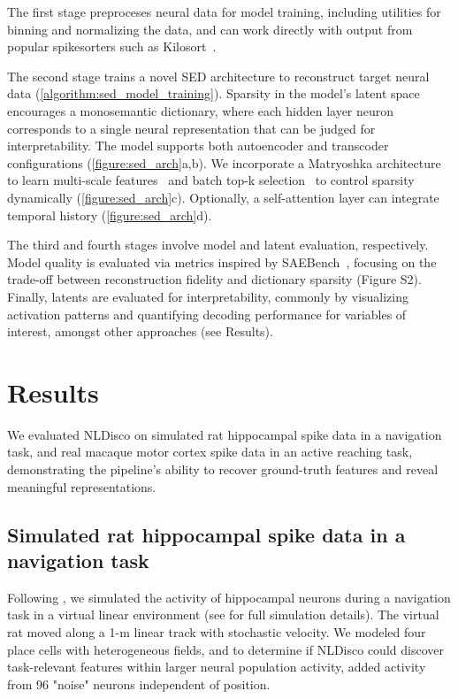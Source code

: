 \documentclass{article}
\begin{document}
The first stage preproceses neural data for model training, including utilities for binning and normalizing the data, and can work directly with output from popular spikesorters such as Kilosort~\citep{pachitariu_2016_kilosort}. 

The second stage trains a novel SED architecture to reconstruct target neural data (\autoref{algorithm:sed_model_training}). Sparsity in the model's latent space encourages a monosemantic dictionary, where each hidden layer neuron corresponds to a single neural representation that can be judged for interpretability. The model supports both autoencoder and transcoder configurations (\autoref{figure:sed_arch}a,b). We incorporate a Matryoshka architecture to learn multi-scale features~\citep{bussmann_2025_msae} and batch top-k selection~\citep{bussmann_2024_batchtopk} to control sparsity dynamically (\autoref{figure:sed_arch}c). Optionally, a self-attention layer can integrate temporal history (\autoref{figure:sed_arch}d).

The third and fourth stages involve model and latent evaluation, respectively. Model quality is evaluated via metrics inspired by SAEBench~\citep{karvonen_2025_saebench}, focusing on the trade-off between reconstruction fidelity and dictionary sparsity (Figure S2). Finally, latents are evaluated for interpretability, commonly by visualizing activation patterns and quantifying decoding performance for variables of interest, amongst other approaches (see Results).

\section{Results}
\label{section:results}

We evaluated NLDisco on simulated rat hippocampal spike data in a navigation task, and real macaque motor cortex spike data in an active reaching task, demonstrating the pipeline's ability to recover ground-truth features and reveal meaningful representations.

\subsection{Simulated rat hippocampal spike data in a navigation task}
\label{subsection:synthetic_results}

Following \citet{theodoni_2018_theta_ou}, we simulated the activity of hippocampal neurons during a navigation task in a virtual linear environment (see  for full simulation details). The virtual rat moved along a 1-m linear track with stochastic velocity. We modeled four place cells with heterogeneous fields, and to determine if NLDisco could discover task-relevant features within larger neural population activity, added activity from 96 "noise" neurons independent of position.
\end{document}
